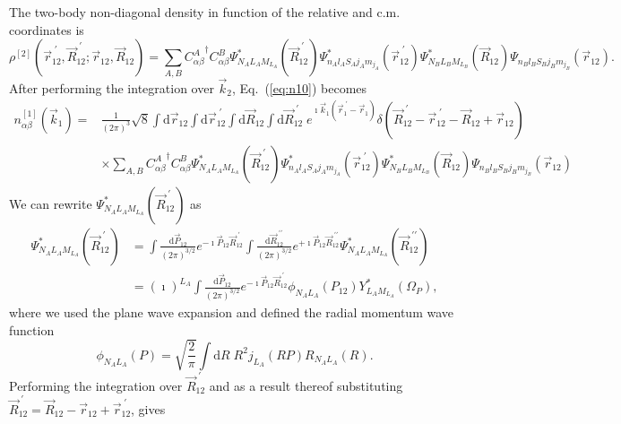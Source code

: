 \documentclass[notitlepage,a4paper,final,amsfonts,amsmath,amssymb]{revtex4-1}
\begin{document}
The two-body non-diagonal density in function of the relative and c.m. coordinates is
\begin{equation}
  \rho^{[2]}(\vec{r}_{12}^{\;\prime},\vec{R}_{12}^{\;\prime};\vec{r}_{12},\vec{R}_{12})
  = 
  \sum_{A,B} {C_{\alpha\beta}^A}^\dagger C_{\alpha\beta}^B
  \Psi_{N_AL_AM_{L_A}}^*(\vec{R}_{12}^{\;\prime})
  \Psi_{n_Al_AS_Aj_Am_{j_A}}^*(\vec{r}_{12}^{\;\prime})
  \Psi_{N_BL_BM_{L_B}}^*(\vec{R}_{12})
  \Psi_{n_Bl_BS_Bj_Bm_{j_B}}(\vec{r}_{12}).
  \label{eq:rho}
\end{equation}
After performing the integration over $\vec{k}_2$, Eq.~(\ref{eq:n10}) becomes 
\begin{align}
  n^{[1]}_{\alpha\beta}(\vec{k}_1) 
  = {} & \frac{1}{(2\pi)^3} \sqrt{8}
  \int \mathrm{d} \vec{r}_{12} \int \mathrm{d} \vec{r}_{12}^{\;\prime} 
  \int \mathrm{d} \vec{R}_{12} \int \mathrm{d} \vec{R}_{12}^{\;\prime} \;
  e^{\imath  \vec{k}_1 (\vec{r}_1^{\;\prime} - \vec{r}_1 )}
  \delta( \vec{R}_{12}^{\;\prime} - \vec{r}_{12}^{\;\prime} - \vec{R}_{12} + \vec{r}_{12})
  \nonumber \\
  & \times
  \sum_{A,B} {C_{\alpha\beta}^A}^\dagger C_{\alpha\beta}^B
  \Psi_{N_AL_AM_{L_A}}^*(\vec{R}_{12}^{\;\prime})
  \Psi_{n_Al_AS_Aj_Am_{j_A}}^*(\vec{r}_{12}^{\;\prime})
  \Psi_{N_BL_BM_{L_B}}^*(\vec{R}_{12})
  \Psi_{n_Bl_BS_Bj_Bm_{j_B}}(\vec{r}_{12})
  \label{eq:n11}
\end{align}
We can rewrite 
$\Psi_{N_AL_AM_{L_A}}^*(\vec{R}_{12}^{\;\prime})$ 
as
\begin{align}
\Psi_{N_AL_AM_{L_A}}^*(\vec{R}_{12}^{\;\prime})
& = 
\int \frac{ \mathrm{d} \vec{P}_{12} }{(2\pi)^{3/2}}
e^{-\imath \vec{P}_{12} \vec{R}_{12}^{\;\prime}}  
\int \frac{ \mathrm{d} \vec{R}_{12}^{\;\prime\prime}}{(2\pi)^{3/2}}
e^{+\imath \vec{P}_{12} \vec{R}_{12}^{\;\prime\prime}}  
\Psi_{N_AL_AM_{L_A}}^*(\vec{R}_{12}^{\;\prime\prime})
\nonumber \\
& = 
(\imath)^{L_A} \int \frac{ \mathrm{d} \vec{P}_{12} }{(2\pi)^{3/2}}
e^{-\imath \vec{P}_{12} \vec{R}_{12}^{\;\prime}}  
\phi_{N_AL_A}(P_{12}) Y^*_{L_A M_{L_A}}(\Omega_P),
\label{eq:psiR}
\end{align}
where we used the plane wave expansion and defined the radial momentum wave function
\begin{equation}
  \phi_{N_AL_A}(P) = \sqrt{\frac{2}{\pi}} \int \mathrm{d}R \; R^2 j_{L_A}(RP) R_{N_AL_A}(R).
\end{equation}
Performing the integration over $\vec{R}_{12}^{\;\prime}$ and as a result thereof substituting $\vec{R}_{12}^{\;\prime} = \vec{R}_{12} - \vec{r}_{12} + \vec{r}_{12}^{\;\prime}$, gives
\end{document}
